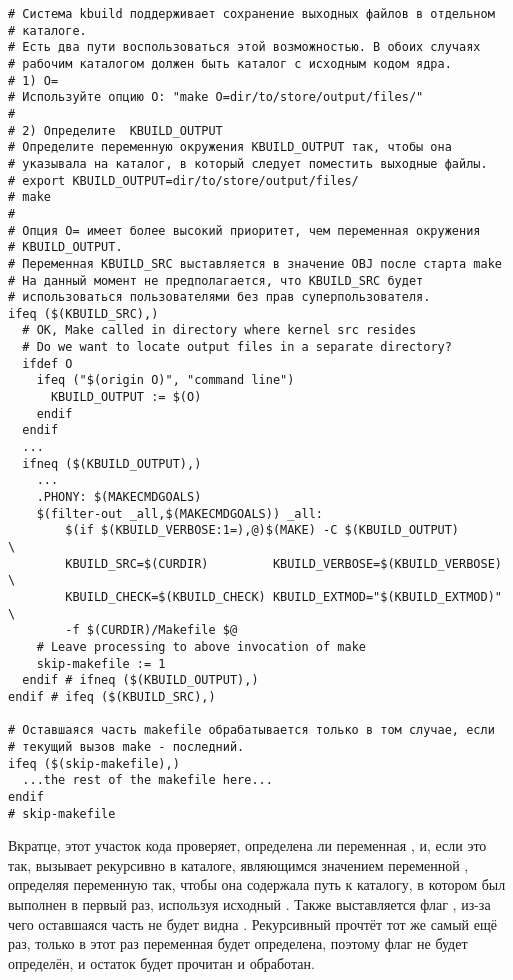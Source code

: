 \begin{verbatim}
# Система kbuild поддерживает сохранение выходных файлов в отдельном
# каталоге.
# Есть два пути воспользоваться этой возможностью. В обоих случаях
# рабочим каталогом должен быть каталог с исходным кодом ядра.
# 1) O=
# Используйте опцию O: "make O=dir/to/store/output/files/"
#
# 2) Определите  KBUILD_OUTPUT
# Определите переменную окружения KBUILD_OUTPUT так, чтобы она
# указывала на каталог, в который следует поместить выходные файлы.
# export KBUILD_OUTPUT=dir/to/store/output/files/
# make
#
# Опция O= имеет более высокий приоритет, чем переменная окружения
# KBUILD_OUTPUT.
# Переменная KBUILD_SRC выставляется в значение OBJ после старта make
# На данный момент не предполагается, что KBUILD_SRC будет
# использоваться пользователями без прав суперпользователя.
ifeq ($(KBUILD_SRC),)
  # OK, Make called in directory where kernel src resides
  # Do we want to locate output files in a separate directory?
  ifdef O
    ifeq ("$(origin O)", "command line")
      KBUILD_OUTPUT := $(O)
    endif
  endif
  ...
  ifneq ($(KBUILD_OUTPUT),)
    ...
    .PHONY: $(MAKECMDGOALS)
    $(filter-out _all,$(MAKECMDGOALS)) _all:
        $(if $(KBUILD_VERBOSE:1=),@)$(MAKE) -C $(KBUILD_OUTPUT)       \
        KBUILD_SRC=$(CURDIR)         KBUILD_VERBOSE=$(KBUILD_VERBOSE) \
        KBUILD_CHECK=$(KBUILD_CHECK) KBUILD_EXTMOD="$(KBUILD_EXTMOD)" \
        -f $(CURDIR)/Makefile $@
    # Leave processing to above invocation of make
    skip-makefile := 1
  endif # ifneq ($(KBUILD_OUTPUT),)
endif # ifeq ($(KBUILD_SRC),)

# Оставшаяся часть makefile обрабатывается только в том случае, если
# текущий вызов make - последний.
ifeq ($(skip-makefile),)
  ...the rest of the makefile here...
endif
# skip-makefile
\end{verbatim}

Вкратце, этот участок кода проверяет, определена ли переменная
, и, если это так, вызывает \GNUmake{}
рекурсивно в каталоге, являющимся значением переменной
\variable{KBUILD\_OUTPUT}, определяя переменную 
так, чтобы она содержала путь к каталогу, в котором \GNUmake{} был
выполнен в первый раз, используя исходный \Makefile{}. Также
выставляется флаг , из-за чего оставшаяся
часть  не будет видна \GNUmake{}. Рекурсивный \GNUmake{}
прочтёт тот же самый \Makefile{} ещё раз, только в этот раз переменная
\variable{KBUILD\_SRC} будет определена, поэтому флаг
\variable{skip-makefile} не будет определён, и остаток \makefile{а}
будет прочитан и обработан.

